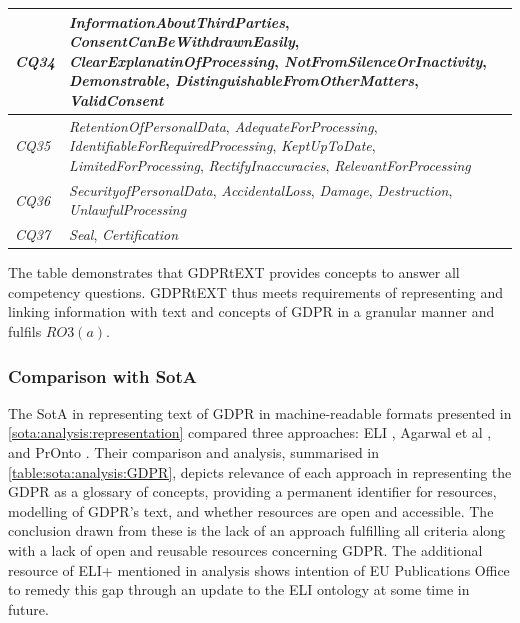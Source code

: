 \begin{center}
\begin{tabularx}{\textwidth}{|l|X|}
\textit{CQ34} & \textit{InformationAboutThirdParties}, \textit{ConsentCanBeWithdrawnEasily}, \textit{ClearExplanatinOfProcessing}, \textit{NotFromSilenceOrInactivity}, \textit{Demonstrable}, \textit{DistinguishableFromOtherMatters}, \textit{ValidConsent} \\ \hline
\textit{CQ35} & \textit{RetentionOfPersonalData}, \textit{AdequateForProcessing}, \textit{IdentifiableForRequiredProcessing}, \textit{KeptUpToDate}, \textit{LimitedForProcessing}, \textit{RectifyInaccuracies}, \textit{RelevantForProcessing} \\ \hline
\textit{CQ36} & \textit{SecurityofPersonalData}, \textit{AccidentalLoss}, \textit{Damage}, \textit{Destruction}, \textit{UnlawfulProcessing} \\ \hline
\textit{CQ37} & \textit{Seal}, \textit{Certification} \\
\bottomrule
\end{tabularx}
\end{center}
The table demonstrates that GDPRtEXT provides concepts to answer all  competency questions. GDPRtEXT thus meets requirements of representing and linking information with text and concepts of GDPR in a granular manner and fulfils $RO3(a)$.

\subsubsection{Comparison with SotA}
The SotA in representing text of GDPR in machine-readable formats presented in \autoref{sota:analysis:representation} compared three approaches: ELI \cite{thomas_european_2019}, Agarwal et al \cite{agarwal_legislative_2018}, and PrOnto \cite{palmirani_pronto_2018,palmirani_pronto_2018-1}.
Their comparison and analysis, summarised in \autoref{table:sota:analysis:GDPR}, depicts relevance of each approach in representing the GDPR as a glossary of concepts, providing a permanent identifier for resources, modelling of GDPR's text, and whether resources are open and accessible.
The conclusion drawn from these is the lack of an approach fulfilling all criteria along with a lack of open and reusable resources concerning GDPR. 
The additional resource of ELI+ mentioned in analysis shows intention of EU Publications Office to remedy this gap through an update to the ELI ontology at some time in future.

